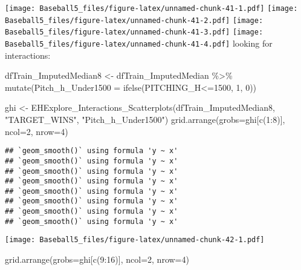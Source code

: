 \documentclass[
]{article}
\newenvironment{Shaded}{\begin{snugshade}}{\end{snugshade}}
\newcommand{\AttributeTok}[1]{\textcolor[rgb]{0.77,0.63,0.00}{#1}}
\newcommand{\DecValTok}[1]{\textcolor[rgb]{0.00,0.00,0.81}{#1}}
\newcommand{\FunctionTok}[1]{\textcolor[rgb]{0.00,0.00,0.00}{#1}}
\newcommand{\NormalTok}[1]{#1}
\newcommand{\OtherTok}[1]{\textcolor[rgb]{0.56,0.35,0.01}{#1}}
\newcommand{\SpecialCharTok}[1]{\textcolor[rgb]{0.00,0.00,0.00}{#1}}
\newcommand{\StringTok}[1]{\textcolor[rgb]{0.31,0.60,0.02}{#1}}
\begin{document}
\texttt{[image: Baseball5\_files/figure-latex/unnamed-chunk-41-1.pdf]}
\texttt{[image: Baseball5\_files/figure-latex/unnamed-chunk-41-2.pdf]}
\texttt{[image: Baseball5\_files/figure-latex/unnamed-chunk-41-3.pdf]}
\texttt{[image: Baseball5\_files/figure-latex/unnamed-chunk-41-4.pdf]}
looking for interactions:

\begin{Shaded}
\begin{Highlighting}[]
\NormalTok{dfTrain\_ImputedMedian8 }\OtherTok{\textless{}{-}}\NormalTok{ dfTrain\_ImputedMedian }\SpecialCharTok{\%\textgreater{}\%}
  \FunctionTok{mutate}\NormalTok{(}\AttributeTok{Pitch\_h\_Under1500 =} \FunctionTok{ifelse}\NormalTok{(PITCHING\_H}\SpecialCharTok{\textless{}=}\DecValTok{1500}\NormalTok{, }\DecValTok{1}\NormalTok{, }\DecValTok{0}\NormalTok{))}

\NormalTok{ghi }\OtherTok{\textless{}{-}} \FunctionTok{EHExplore\_Interactions\_Scatterplots}\NormalTok{(dfTrain\_ImputedMedian8, }\StringTok{"TARGET\_WINS"}\NormalTok{, }\StringTok{"Pitch\_h\_Under1500"}\NormalTok{)}
\FunctionTok{grid.arrange}\NormalTok{(}\AttributeTok{grobs=}\NormalTok{ghi[}\FunctionTok{c}\NormalTok{(}\DecValTok{1}\SpecialCharTok{:}\DecValTok{8}\NormalTok{)], }\AttributeTok{ncol=}\DecValTok{2}\NormalTok{, }\AttributeTok{nrow=}\DecValTok{4}\NormalTok{)}
\end{Highlighting}
\end{Shaded}

\begin{verbatim}
## `geom_smooth()` using formula 'y ~ x'
## `geom_smooth()` using formula 'y ~ x'
## `geom_smooth()` using formula 'y ~ x'
## `geom_smooth()` using formula 'y ~ x'
## `geom_smooth()` using formula 'y ~ x'
## `geom_smooth()` using formula 'y ~ x'
## `geom_smooth()` using formula 'y ~ x'
## `geom_smooth()` using formula 'y ~ x'
\end{verbatim}

\texttt{[image: Baseball5\_files/figure-latex/unnamed-chunk-42-1.pdf]}

\begin{Shaded}
\begin{Highlighting}[]
\FunctionTok{grid.arrange}\NormalTok{(}\AttributeTok{grobs=}\NormalTok{ghi[}\FunctionTok{c}\NormalTok{(}\DecValTok{9}\SpecialCharTok{:}\DecValTok{16}\NormalTok{)], }\AttributeTok{ncol=}\DecValTok{2}\NormalTok{, }\AttributeTok{nrow=}\DecValTok{4}\NormalTok{)}
\end{Highlighting}
\end{Shaded}
\end{document}
